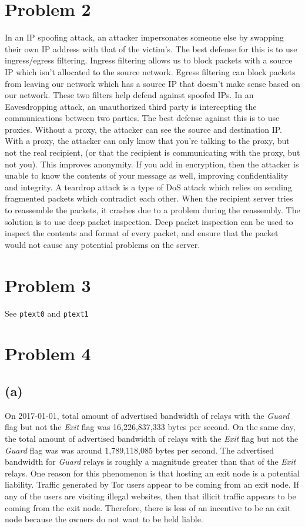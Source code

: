 \documentclass{article}
\begin{document}
\section*{Problem 2}
In an IP spoofing attack, an attacker impersonates someone else by swapping their own IP address with that of the victim's. The best defense for this is to use ingress/egress filtering. Ingress filtering allows us to block packets with a source IP which isn't allocated to the source network. Egress filtering can block packets from leaving our network which has a source IP that doesn't make sense based on our network. These two filters help defend against spoofed IPs. 
\newline\newline
In an Eavesdropping attack, an unauthorized third party is intercepting the communications between two parties. The best defense against this is to use proxies. Without a proxy, the attacker can see the source and destination IP. With a proxy, the attacker can only know that you're talking to the proxy, but not the real recipient, (or that the recipient is communicating with the proxy, but not you). This improves anonymity. If you add in encryption, then the attacker is unable to know the contents of your message as well, improving confidentiality and integrity. 
\newline\newline
A teardrop attack is a type of DoS attack which relies on sending fragmented packets which contradict each other. When the recipient server tries to reassemble the packets, it crashes due to a problem during the reassembly. The solution is to use deep packet inspection. Deep packet inspection can be used to inspect the contents and format of every packet, and ensure that the packet would not cause any potential problems on the server.

\section*{Problem 3}
See \texttt{ptext0} and \texttt{ptext1}

\section*{Problem 4}
\subsection*{(a)}
On 2017-01-01, total amount of advertised bandwidth of relays with the \textit{Guard} flag but not the \textit{Exit} flag was  16,226,837,333 bytes per second. On the same day, the total amount of advertised bandwidth of relays with the \textit{Exit} flag but not the \textit{Guard} flag was was around 1,789,118,085 bytes per second. The advertised bandwidth for \textit{Guard} relays is roughly a magnitude greater than that of the \textit{Exit} relays. One reason for this phenomenon is that hosting an exit node is a potential liability. Traffic generated by Tor users appear to be coming from an exit node. If any of the users are visiting illegal websites, then that illicit traffic appears to be coming from the exit node. Therefore, there is less of an incentive to be an exit node because the owners do not want to be held liable.
\end{document}
